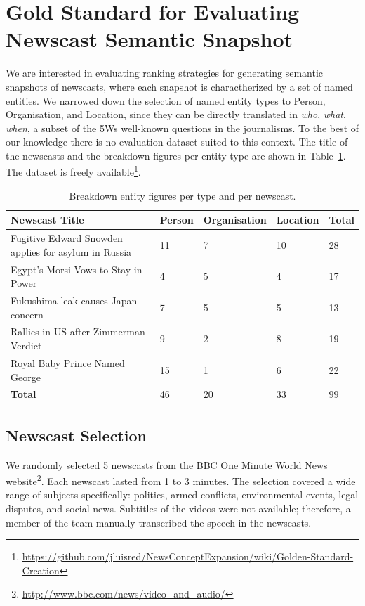 \documentclass{llncs}
\begin{document}
\section{Gold Standard for Evaluating Newscast Semantic Snapshot}
\label{sec:GoldStandard}
We are interested in evaluating ranking strategies for generating semantic snapshots of newscasts, where each snapshot is charactherized by a set of named entities. We narrowed down the selection of named entity types to Person, Organisation, and Location, since they can be directly translated in \textit{who}, \textit{what}, \textit{when}, a subset of the 5Ws well-known questions in the journalisms. To the best of our knowledge there is no evaluation dataset suited to this context. The title of the newscasts and the breakdown figures per entity type are shown in Table~\ref{table:entitydistribution}. The dataset is freely available\footnote{\url{https://github.com/jluisred/NewsConceptExpansion/wiki/Golden-Standard-Creation}}.

\begin{table}
\begin{tabular}{| p{6cm} | l| l| l| l|}
  \hline
  \textbf{Newscast Title} & \textbf{Person} & \textbf{Organisation} &\textbf{Location} & \textbf{Total} \\
    \hline
  Fugitive Edward Snowden applies for asylum in Russia & 11 & 7 & 10 & 28 \\
    \hline
 Egypt's Morsi Vows to Stay in Power & 4 & 5 & 4 & 17 \\
    \hline
 Fukushima leak causes Japan concern & 7 & 5 & 5 & 13\\
    \hline
 Rallies in US after Zimmerman Verdict & 9 & 2 & 8 & 19 \\
    \hline
 Royal Baby Prince Named George & 15 & 1 & 6 & 22 \\
    \hline
    \textbf{Total}  & 46 & 20 & 33 & 99\\
  \hline
\end{tabular}
\caption[Table caption text]{Breakdown entity figures per type and per newscast.}
\label{table:entitydistribution}
\end{table}

\subsection{Newscast Selection}
We randomly selected 5 newscasts from the BBC One Minute World News website\footnote{\url{http://www.bbc.com/news/video_and_audio/}}. Each newscast lasted from 1 to 3 minutes. The selection covered a wide range of subjects specifically: politics, armed conflicts, environmental events, legal disputes, and social news. 
Subtitles of the videos were not available; therefore, a member of the team manually transcribed the speech in the newscasts.
\end{document}
